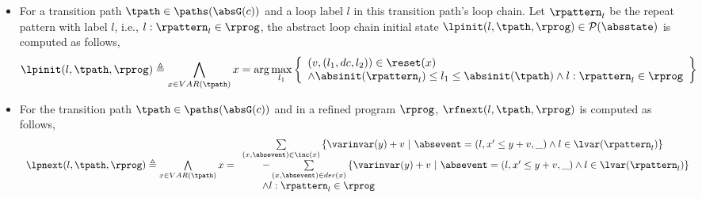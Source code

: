 \begin{enumerate}
\begin{itemize}
\item For a transition path $\tpath \in \paths(\absG(c))$ and a loop label $l$ in this transition path's loop chain.
Let $\rpattern_l$ be the repeat pattern with label $l$, i.e., $l: \rpattern_l \in \rprog$, 
the abstract loop chain initial state $\lpinit(l, \tpath, \rprog) \in \mathcal{P}(\absstate)$ is computed as follows,
\[
  \lpinit(l, \tpath, \rprog) \triangleq 
  \bigwedge_{x \in VAR(\tpath)}
  x = \arg\max_{l_1}
  \left\{
      \begin{array}{l}
    (v, (l_1, dc, l_2)) \in \reset(x) 
        \\ 
    \land \absinit(\rpattern_l) \leq l_1 \leq \absinit(\tpath)
    \land l: \rpattern_l \in \rprog
    \end{array}
    \right\}
  \]
\item
For the transition path $\tpath \in \paths(\absG(c))$ and in a refined program $\rprog$,
$\rfnext(l, \tpath, \rprog)$ is computed as follows,
%
\[
  \begin{array}{l}
  \lpnext(l, \tpath, \rprog) \triangleq 
  \bigwedge\limits_{x \in VAR(\tpath)}
    x =   
    \begin{array}{l}
  \sum\limits_{(x, \absevent) \in \inc(x) }\left\{ 
    \varinvar(y) + v ~\middle\vert~ \absevent = (l, x' \leq y + v, \_) \land l \in \lvar(\rpattern_l)\right\}
    \\ \qquad 
    - \sum\limits_{(x, \absevent) \in dec(x) }\left\{ 
      \varinvar(y) + v 
      ~\middle\vert~ \absevent = (l, x' \leq y + v, \_) \land l \in \lvar(\rpattern_l) \right\}
      \\
      \qquad 
      \land l: \rpattern_l \in \rprog
    \end{array}
  \end{array}
\]
%
\end{itemize}
\end{enumerate}
%


